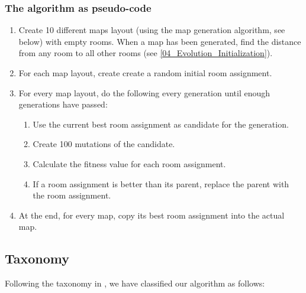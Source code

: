 \subsubsection{The algorithm as pseudo-code}
\begin{enumerate}

	\item Create 10 different maps layout (using the map generation algorithm, see below) with empty rooms. When a map has been generated, find the distance from any room to all other rooms (see \ref{04_Evolution_Initialization}).

	\item For each map layout, create create a random initial room assignment.

	\item For every map layout, do the following every generation until enough generations have passed:

	\begin{enumerate}

		\item Use the current best room assignment as candidate for the generation.

		\item Create 100 mutations of the candidate.

		\item Calculate the fitness value for each room assignment.

		\item If a room assignment is better than its parent, replace the parent with the room assignment.

	\end{enumerate}

	\item At the end, for every map, copy its best room assignment into the actual map.

\end{enumerate}

\subsection{Taxonomy}
\label{04_Taxonomy}

Following the taxonomy in \cite{togelius2010search}, we have classified our algorithm as follows:

